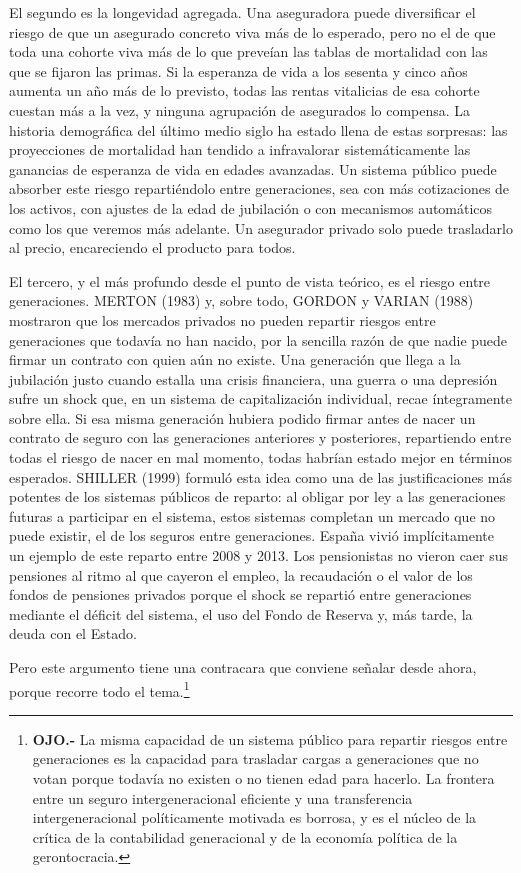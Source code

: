 \documentclass[10pt,a4paper]{article}
\begin{document}
El segundo es la longevidad agregada. Una aseguradora puede diversificar el riesgo de que un asegurado concreto viva más de lo esperado, pero no el de que toda una cohorte viva más de lo que preveían las tablas de mortalidad con las que se fijaron las primas. Si la esperanza de vida a los sesenta y cinco años aumenta un año más de lo previsto, todas las rentas vitalicias de esa cohorte cuestan más a la vez, y ninguna agrupación de asegurados lo compensa. La historia demográfica del último medio siglo ha estado llena de estas sorpresas: las proyecciones de mortalidad han tendido a infravalorar sistemáticamente las ganancias de esperanza de vida en edades avanzadas. Un sistema público puede absorber este riesgo repartiéndolo entre generaciones, sea con más cotizaciones de los activos, con ajustes de la edad de jubilación o con mecanismos automáticos como los que veremos más adelante. Un asegurador privado solo puede trasladarlo al precio, encareciendo el producto para todos.

El tercero, y el más profundo desde el punto de vista teórico, es el riesgo entre generaciones. MERTON (1983) y, sobre todo, GORDON y VARIAN (1988) mostraron que los mercados privados no pueden repartir riesgos entre generaciones que todavía no han nacido, por la sencilla razón de que nadie puede firmar un contrato con quien aún no existe. Una generación que llega a la jubilación justo cuando estalla una crisis financiera, una guerra o una depresión sufre un shock que, en un sistema de capitalización individual, recae íntegramente sobre ella. Si esa misma generación hubiera podido firmar antes de nacer un contrato de seguro con las generaciones anteriores y posteriores, repartiendo entre todas el riesgo de nacer en mal momento, todas habrían estado mejor en términos esperados. SHILLER (1999) formuló esta idea como una de las justificaciones más potentes de los sistemas públicos de reparto: al obligar por ley a las generaciones futuras a participar en el sistema, estos sistemas completan un mercado que no puede existir, el de los seguros entre generaciones. España vivió implícitamente un ejemplo de este reparto entre 2008 y 2013. Los pensionistas no vieron caer sus pensiones al ritmo al que cayeron el empleo, la recaudación o el valor de los fondos de pensiones privados porque el shock se repartió entre generaciones mediante el déficit del sistema, el uso del Fondo de Reserva y, más tarde, la deuda con el Estado.

Pero este argumento tiene una contracara que conviene señalar desde ahora, porque recorre todo el tema.\footnote{%
    \textbf{OJO.-} La misma capacidad de un sistema público para repartir riesgos entre generaciones es la capacidad para trasladar cargas a generaciones que no votan porque todavía no existen o no tienen edad para hacerlo. La frontera entre un seguro intergeneracional eficiente y una transferencia intergeneracional políticamente motivada es borrosa, y es el núcleo de la crítica de la contabilidad generacional y de la economía política de la gerontocracia.
}
\end{document}
